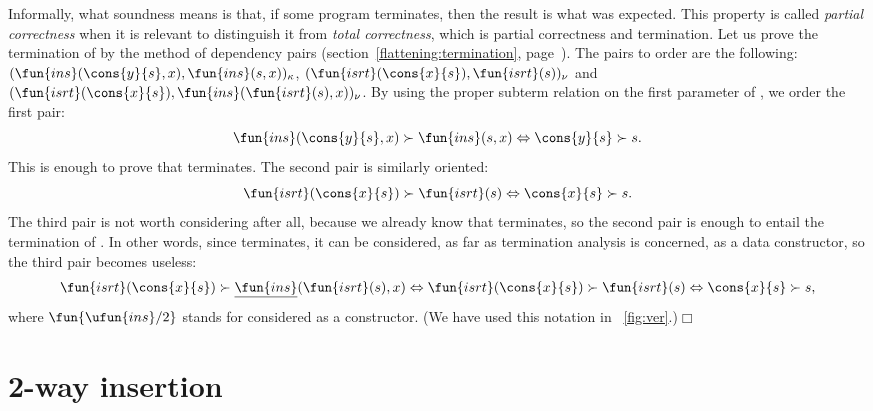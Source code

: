 
Informally, what soundness means is that, if some program terminates,
then the result is what was expected. This property is called
\emph{partial correctness} when it is relevant to distinguish it from
\emph{total correctness}, which is partial correctness and
termination. Let us prove the termination of  by the
method of dependency pairs
(section~\ref{flattening:termination},
page~\pageref{flattening:termination}). The pairs to order are
the following: \((\fun{ins}(\cons{y}{s},x), \fun{ins}(s,x))_\kappa\),
\((\fun{isrt}(\cons{x}{s}), \fun{isrt}(s))_\nu\) and
\((\fun{isrt}(\cons{x}{s}), \fun{ins}(\fun{isrt}(s), x))_\nu\). By
using the proper subterm
relation on the first parameter of ,
we order the first pair:
\begin{equation*}
\fun{ins}(\cons{y}{s},x) \succ \fun{ins}(s,x) \Leftrightarrow
\cons{y}{s} \succ s.
\end{equation*}
This is enough to prove that  terminates. The second pair
is similarly oriented:
\begin{equation*}
\fun{isrt}(\cons{x}{s}) \succ \fun{isrt}(s) \Leftrightarrow
\cons{x}{s} \succ s.
\end{equation*}
The third pair is not worth considering after all, because we already
know that  terminates, so the second pair is enough to
entail the termination of . In
other words, since  terminates, it can be considered, as
far as termination analysis is concerned, as a data constructor, so
the third pair becomes useless:
\begin{equation*}
\fun{isrt}(\cons{x}{s}) \succ \underline{\fun{ins}}(\fun{isrt}(s), x)
\Leftrightarrow \fun{isrt}(\cons{x}{s}) \succ \fun{isrt}(s)
\Leftrightarrow \cons{x}{s} \succ s,
\end{equation*}
where \(\fun{\ufun{ins}/2}\) stands for
 considered as a constructor. (We
have used this notation in \fig~\vref{fig:ver}.)\hfill\(\Box\)

\section{2-way insertion}
\label{sec:2-way}

